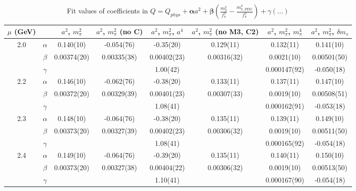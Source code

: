 \documentclass[12pt]{extarticle}
\begin{document}
\begin{table}[h!]
\begin{center}
\begin{tabular}{|c c|c|c|c|c|c|c|}
\hline
$\mu$ (GeV) &  & $a^2$, $m_\pi^2$& $a^2$, $m_\pi^2$ (no C)& $a^2$, $m_\pi^2$, $a^4$& $a^2$, $m_\pi^2$ (no M3, C2)& $a^2$, $m_\pi^2$, $m_\pi^4$& $a^2$, $m_\pi^2$, $\delta m_s$\\
\hline
\multirow{3}{0.5in}{2.0} & $\alpha$ & 0.140(10)& -0.054(76)& -0.35(20)& 0.129(11)& 0.132(11)& 0.141(10)\\
 & $\beta$ & 0.00374(20)& 0.00335(38)& 0.00402(23)& 0.00316(32)& 0.0021(10)& 0.00501(50)\\
 & $\gamma$ &  &  & 1.00(42)&  & 0.000147(92)& -0.050(18)\\
\hline
\multirow{3}{0.5in}{2.2} & $\alpha$ & 0.146(10)& -0.062(76)& -0.38(20)& 0.133(11)& 0.137(11)& 0.147(10)\\
 & $\beta$ & 0.00372(20)& 0.00329(39)& 0.00401(23)& 0.00307(33)& 0.0019(10)& 0.00508(51)\\
 & $\gamma$ &  &  & 1.08(41)&  & 0.000162(91)& -0.053(18)\\
\hline
\multirow{3}{0.5in}{2.3} & $\alpha$ & 0.148(10)& -0.064(76)& -0.38(20)& 0.135(11)& 0.139(11)& 0.149(10)\\
 & $\beta$ & 0.00373(20)& 0.00327(39)& 0.00402(23)& 0.00306(32)& 0.0019(10)& 0.00511(50)\\
 & $\gamma$ &  &  & 1.08(41)&  & 0.000165(92)& -0.054(18)\\
\hline
\multirow{3}{0.5in}{2.4} & $\alpha$ & 0.149(10)& -0.064(76)& -0.39(20)& 0.135(11)& 0.140(11)& 0.150(10)\\
 & $\beta$ & 0.00373(20)& 0.00327(38)& 0.00404(22)& 0.00306(32)& 0.0019(10)& 0.00513(50)\\
 & $\gamma$ &  &  & 1.10(41)&  & 0.000167(90)& -0.054(18)\\
\hline
\end{tabular}
\caption{Fit values of coefficients in $Q = Q_{phys} + \mathbf{\alpha} a^2 + \mathbf{\beta}\left(\frac{m_\pi^2}{f_\pi^2}-\frac{m_{\pi,PDG}^2}{f_\pi^2}\right) + \gamma(\ldots)$}
\end{center}
\end{table}






\end{document}
